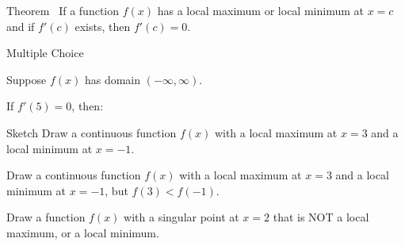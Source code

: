 \begin{frame}
\begin{block}{Theorem~}
If a function $f(x)$ has a local maximum or local minimum at $x=c$ and if $f'(c)$ exists, then $f'(c)=0$.
\end{block}
\end{frame}
\begin{frame}[t]{Multiple Choice}
\AnswerSpace
{}

Suppose $f(x)$ has domain $(-\infty,\infty)$.


If $f'(5)=0$, then:
\pause


\end{frame}
\begin{frame}[t]{Sketch}
\AnswerNo{}
Draw a continuous function $f(x)$ with a local maximum at $x=3$ and a local minimum at $x=-1$.

\vfill

Draw a  continuous function $f(x)$ with a local maximum at $x=3$ and a local minimum at $x=-1$, but $f(3)<f(-1)$.

\vfill

Draw a function $f(x)$ with a singular point at $x=2$ that is NOT a local maximum, or a local minimum.

\end{frame}

